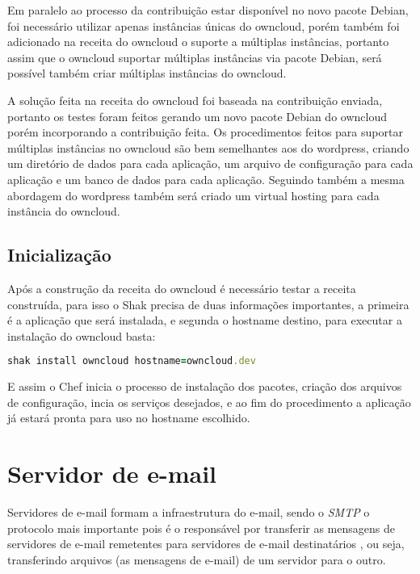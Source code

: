 Em paralelo ao processo da contribuição estar disponível no novo pacote Debian,
foi necessário utilizar apenas instâncias únicas do owncloud, porém também foi
adicionado na receita do owncloud o suporte a múltiplas instâncias, portanto
assim que o owncloud suportar múltiplas instâncias via pacote Debian, será possível
também criar múltiplas instâncias do owncloud.

A solução feita na receita do owncloud foi baseada na contribuição enviada, portanto
os testes foram feitos gerando um novo pacote Debian do owncloud porém incorporando
a contribuição feita. Os procedimentos feitos para suportar múltiplas instâncias
no owncloud são bem semelhantes aos do wordpress, criando um diretório de dados
para cada aplicação, um arquivo de configuração para cada aplicação e um banco de
dados para cada aplicação. Seguindo também a mesma abordagem do wordpress também
será criado um virtual hosting para cada instância do owncloud.

\subsection{Inicialização}

Após a construção da receita do owncloud é necessário testar a receita construída,
para isso o Shak precisa de duas informações importantes, a primeira é a aplicação
que será instalada, e segunda o hostname destino, para executar a instalação
do owncloud basta:

\begin{lstlisting}[language=Ruby,label=dice_index,caption={Exemplo de execução de instalação do owncloud com shak}]
shak install owncloud hostname=owncloud.dev
\end{lstlisting}

E assim o Chef inicia o processo de instalação dos pacotes, criação dos arquivos
de configuração, incia os serviços desejados, e ao fim do procedimento a aplicação
já estará pronta para uso no hostname escolhido.


\section{Servidor de e-mail}
\label{sub:e-mail}

Servidores de e-mail formam a infraestrutura do e-mail, sendo o \textit{SMTP} o protocolo
mais importante pois é o responsável por transferir as mensagens de servidores
de e-mail remetentes para servidores de e-mail destinatários \cite{kurose2010redes}, 
ou seja, transferindo
arquivos (as mensagens de e-mail) de um servidor para o outro. 

